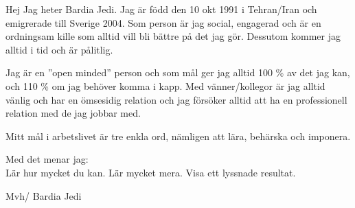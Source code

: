 \documentclass[12pt,a4paper]{article}
\begin{document}
	\begin{flushleft}
	\setlength{\parindent}{2ex}	
			\hspace{2ex}
			Hej Jag heter Bardia Jedi.	
			Jag är född den 10 okt 1991 i Tehran/Iran och emigrerade till Sverige 2004. 
			Som person är jag social, engagerad och är en ordningsam kille som alltid vill bli	bättre på det jag gör. 
			Dessutom kommer jag alltid i tid och är pålitlig.
\vspace{12pt}

			Jag är en ”open minded” person och som mål ger jag alltid 100 \% av det jag kan, och 110 \% om jag behöver komma i kapp. 
			Med vänner/kollegor är jag alltid vänlig och har en ömsesidig relation och jag försöker alltid att ha en professionell relation med de jag jobbar med.
			\vspace{12pt}

		Mitt mål i arbetslivet är tre enkla ord, nämligen att lära, behärska och imponera.
		
		\vspace{12pt}		
		\noindent 
		Med det menar jag:\\
		\noindent		
		Lär hur mycket du kan. Lär mycket mera. Visa ett lyssnade resultat.
		\vspace{24pt}
		
		\noindent
		Mvh/ Bardia Jedi
	\end{flushleft}
	
	
	
\end{document}
